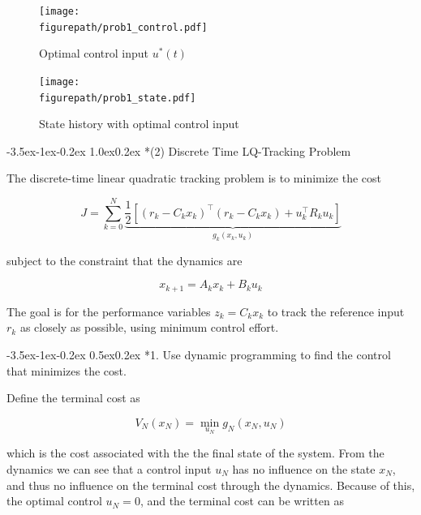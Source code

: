 \documentclass[11pt,letterpaper,onecolumn,notitlepage]{article}
\makeatletter
\newcommand{\figurepath}{../fig/hw2}
\renewcommand\section{\@startsection{section}{1}{\z@}%
{-3.5ex\@plus-1ex\@minus-0.2ex}%
{1.0ex\@plus0.2ex}%
{\fontsize{12pt}{12pt}\selectfont\bfseries\sffamily}}
\renewcommand\subsection{\@startsection{subsection}{1}{\z@}%
{-3.5ex\@plus-1ex\@minus-0.2ex}%
{0.5ex\@plus0.2ex}%
{\fontsize{10pt}{10pt}\selectfont\bfseries\sffamily}}
\makeatother
\begin{document}
\begin{figure}[H]
  \centering
  \begin{minipage}{.48\textwidth}
    \centering
    \texttt{[image: \\figurepath/prob1\_control.pdf]}
    \caption{Optimal control input $u^{*}(t)$\label{fig:part1_control}}
  \end{minipage}
  \hfill
  \begin{minipage}{.48\textwidth}
    \centering
    \texttt{[image: \\figurepath/prob1\_state.pdf]}
    \caption{State history with optimal control input\label{fig:part1_state}}
  \end{minipage}
\end{figure}

\clearpage
\section*{(2) Discrete Time LQ-Tracking Problem}

The discrete-time linear quadratic tracking problem is to minimize the cost

\begin{equation*}
  J=\sum_{k=0}^{N}\underbrace{\frac{1}{2}\left[(r_{k}-C_{k}x_{k})^{\top}(r_{k}-C_{k}x_{k})+u_{k}^{\top}R_{k}u_{k}\right]}_{g_{k}(x_{k},u_{k})}
\end{equation*}

subject to the constraint that the dynamics are

\begin{equation*}
  x_{k+1}=A_{k}x_{k}+B_{k}u_{k}
\end{equation*}

The goal is for the performance variables $z_{k}=C_{k}x_{k}$ to track the reference input $r_{k}$ as closely as possible, using minimum control effort.

\subsection*{1. Use dynamic programming to find the control that minimizes the cost.}

Define the terminal cost as

\begin{equation*}
  V_{N}(x_{N})=\min_{u_{N}}g_{N}(x_{N},u_{N})
\end{equation*}

which is the cost associated with the the final state of the system.
From the dynamics we can see that a control input $u_{N}$ has no influence on the state $x_{N}$, and thus no influence on the terminal cost through the dynamics.
Because of this, the optimal control $u_{N}=0$, and the terminal cost can be written as
\end{document}

